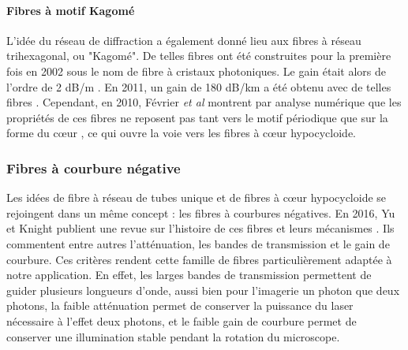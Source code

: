 \paragraph{Fibres à motif Kagomé}
L'idée du réseau de diffraction a également donné lieu aux fibres à réseau trihexagonal, ou "Kagomé". De telles fibres ont été construites pour la première fois en 2002 sous le nom de fibre à cristaux photoniques. Le gain était alors de l'ordre de 2 dB/m \cite{benabid_stimulated_2002}. En 2011, un gain de 180 dB/km a été obtenu avec de telles fibres \cite{wang_low_2011}.
Cependant, en 2010, Février \emph{et al} montrent par analyse numérique que les propriétés de ces fibres ne reposent pas tant vers le motif périodique que sur la forme du cœur \cite{fevrier_understanding_2010}, ce qui ouvre la voie vers les fibres à cœur hypocycloide. 


\subsubsection{Fibres à courbure négative}

Les idées de fibre à réseau de tubes unique et de fibres à cœur hypocycloide se rejoingent dans un même concept : les fibres à courbures négatives. En 2016, Yu et Knight publient une revue sur l'histoire de ces fibres et leurs mécanismes \cite{yu_negative_2016}. Ils commentent entre autres l'atténuation, les bandes de transmission et le gain de courbure. Ces critères rendent cette famille de fibres particulièrement adaptée à notre application. En effet, les larges bandes de transmission permettent de guider plusieurs longueurs d'onde, aussi bien pour l'imagerie un photon que deux photons, la faible atténuation permet de conserver la puissance du laser nécessaire à l'effet deux photons, et le faible gain de courbure permet de conserver une illumination stable pendant la rotation du microscope.


